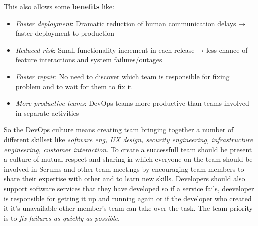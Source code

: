 \documentclass[10pt,a4paper]{report}
\begin{document}
This also allows some \textbf{benefits} like:
\begin{itemize}
	\item \textit{Faster deployment}: Dramatic reduction of human communication delays → faster deployment
		to production
	\item \textit{Reduced risk}: Small functionality increment in each release → less chance of feature
		interactions and system failures/outages
	\item \textit{Faster repair}: No need to discover which team is responsible for fixing problem and to wait for them to fix it
 	\item \textit{More productive teams}: DevOps teams more productive than teams involved in separate activities
\end{itemize}
So the DevOps culture means creating team bringing together a number of different skillset like \textit{software eng, UX design, security engineering, infrastructure engineering, customer interaction}. To create a successfull team should be present a culture of mutual respect and sharing in which everyone on the team should be involved in Scrums and other team meetings by encouraging team members to share their expertise with other and to learn new skills. Developers should also support software services that they have developed so if a service fails, deeveloper is responsible for getting it up and running again or if the developer who created it it's unavailable other member's team can take over the task. The team priority is to \textit{fix failures as quickly as possible}. 
\end{document}
